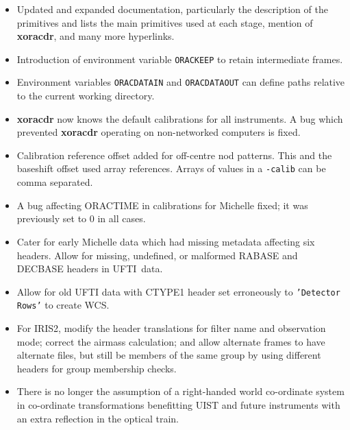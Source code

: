 \documentclass[twoside,11pt]{article}
\newcommand{\htmladdnormallink}[2]{#1}
\newcommand{\htmlref}[2]{#1}
\newcommand{\xref}[3]{#1}
\renewcommand{\_}{\texttt{\symbol{95}}}
\newcommand{\IRIS}{\htmladdnormallink{IRIS2}{http://www.aao.gov.au/iris2/}}
\newcommand{\UFTI}{\htmladdnormallink{UFTI}{http://www.jach.hawaii.edu/JACpublic/UKIRT/instruments/ufti/ufti.html}}
\begin{document}
\begin{itemize}
   \item Updated and expanded documentation, particularly the 
   \htmlref{description of the primitives}{features_of_the_primitives}
   and lists the main primitives used at each stage, mention of
   \xref{{\bf xoracdr}}{sun230}{xoracdr}, and many more hyperlinks.

   \item Introduction of environment variable {\tt ORAC\_KEEP} to retain
   intermediate frames.

   \item Environment variables {\tt ORAC\_DATA\_IN} and {\tt ORAC\_DATA\_OUT}
   can define paths relative to the current working directory.

   \item {\bf xoracdr} now knows the default calibrations for all
   instruments.  A bug which prevented {\bf xoracdr} operating on
   non-networked computers is fixed.

   \item Calibration reference offset added for off-centre nod patterns.
   This and the baseshift offset used array references.  Arrays of
   values in a {\tt -calib} can be comma separated.
   
   \item A bug affecting ORACTIME in calibrations for Michelle fixed;
   it was previously set to 0 in all cases.

   \item Cater for early Michelle data which had missing metadata
   affecting six headers.  Allow for missing, undefined, or malformed
   RA\_BASE and DEC\_BASE headers in \UFTI\ data.

   \item Allow for old UFTI data with CTYPE1 header set erroneously to 
   {\tt 'Detector Rows'} to create WCS.
   
   \item For \IRIS, modify the header translations for filter name 
   and observation mode; correct the airmass calculation; and allow
   alternate frames to have alternate files, but still be members of the
   same group by using different headers for group membership checks.

   \item There is no longer the assumption of a right-handed world
   co-ordinate system in co-ordinate transformations benefitting UIST
   and future instruments with an extra reflection in the optical train.


\end{itemize}
\end{document}
